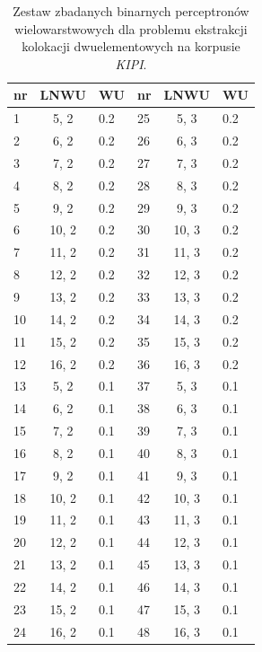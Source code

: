 \documentclass[11pt,a4paper]{llncs}
\begin{document}
\begin{table}[h!]
\centering
\footnotesize\setlength{\tabcolsep}{2.5pt}
\begin{tabular}{ l | c | l || l | c | l }
	\toprule
	\textbf{nr} 	& \textbf{LNWU}	& \textbf{WU}	& \textbf{nr}	& \textbf{LNWU}	& \textbf{WU}	\\
	\midrule
	1	&	5, 2	& 0.2	& 25	& 5, 3	& 0.2 \\
	2	&	6, 2	& 0.2	& 26	& 6, 3	& 0.2 \\
	3	&	7, 2	& 0.2	& 27	& 7, 3 	& 0.2 \\
	4	&	8, 2	& 0.2	& 28	& 8, 3	& 0.2 \\
	5	&	9, 2	& 0.2	& 29	& 9, 3	& 0.2 \\
	6	&	10, 2	& 0.2	& 30	& 10, 3	& 0.2 \\
	7	&	11, 2	& 0.2	& 31	& 11, 3	& 0.2 \\
	8	&	12, 2	& 0.2	& 32	& 12, 3	& 0.2 \\
	9	&	13, 2	& 0.2	& 33	& 13, 3	& 0.2 \\
	10	&	14, 2	& 0.2	& 34	& 14, 3	& 0.2 \\
	11	&	15, 2	& 0.2	& 35	& 15, 3	& 0.2 \\
	12	&	16, 2	& 0.2	& 36	& 16, 3	& 0.2 \\
	13	&	5, 2	& 0.1	& 37	& 5, 3	& 0.1 \\
	14	&	6, 2	& 0.1	& 38	& 6, 3	& 0.1 \\
	15	&	7, 2	& 0.1	& 39	& 7, 3	& 0.1 \\
	16	&	8, 2	& 0.1	& 40	& 8, 3	& 0.1 \\
	17	&	9, 2	& 0.1	& 41	& 9, 3	& 0.1 \\
	18	&	10, 2	& 0.1	& 42	& 10, 3	& 0.1 \\
	19	&	11, 2	& 0.1	& 43	& 11, 3	& 0.1 \\
	20	&	12, 2	& 0.1	& 44	& 12, 3	& 0.1 \\
	21	&	13, 2	& 0.1	& 45	& 13, 3	& 0.1 \\
	22	&	14, 2	& 0.1	& 46	& 14, 3	& 0.1 \\
	23	&	15, 2	& 0.1	& 47	& 15, 3	& 0.1 \\
	24	&	16, 2	& 0.1	& 48	& 16, 3	& 0.1 \\
	\bottomrule
\end{tabular}
\caption[Zestaw zbadanych binarnych perceptronów wielowarstwowych dla problemu ekstrakcji kolokacji dwuelementowych na korpusie \emph{KIPI}]{Zestaw zbadanych binarnych perceptronów wielowarstwowych dla problemu ekstrakcji kolokacji dwuelementowych na korpusie \emph{KIPI}.}
\label{KIPI_2_classifiers_set}
\end{table}
\end{document}
